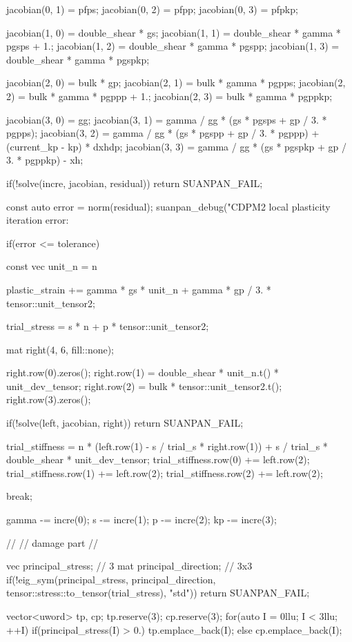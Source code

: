 \begin{cppcode}
{{		jacobian(0, 1) = pfps;
		jacobian(0, 2) = pfpp;
		jacobian(0, 3) = pfpkp;

		jacobian(1, 0) = double_shear * gs;
		jacobian(1, 1) = double_shear * gamma * pgsps + 1.;
		jacobian(1, 2) = double_shear * gamma * pgspp;
		jacobian(1, 3) = double_shear * gamma * pgspkp;

		jacobian(2, 0) = bulk * gp;
		jacobian(2, 1) = bulk * gamma * pgpps;
		jacobian(2, 2) = bulk * gamma * pgppp + 1.;
		jacobian(2, 3) = bulk * gamma * pgppkp;

		jacobian(3, 0) = gg;
		jacobian(3, 1) = gamma / gg * (gs * pgsps + gp / 3. * pgpps);
		jacobian(3, 2) = gamma / gg * (gs * pgspp + gp / 3. * pgppp) + (current_kp - kp) * dxhdp;
		jacobian(3, 3) = gamma / gg * (gs * pgspkp + gp / 3. * pgppkp) - xh;

		if(!solve(incre, jacobian, residual)) return SUANPAN_FAIL;

		const auto error = norm(residual);
		suanpan_debug("CDPM2 local plasticity iteration error: %

		if(error <= tolerance) {
			const vec unit_n = n %

			plastic_strain += gamma * gs * unit_n + gamma * gp / 3. * tensor::unit_tensor2;

			trial_stress = s * n + p * tensor::unit_tensor2;

			mat right(4, 6, fill::none);

			right.row(0).zeros();
			right.row(1) = double_shear * unit_n.t() * unit_dev_tensor;
			right.row(2) = bulk * tensor::unit_tensor2.t();
			right.row(3).zeros();

			if(!solve(left, jacobian, right)) return SUANPAN_FAIL;

			trial_stiffness = n * (left.row(1) - s / trial_s * right.row(1)) + s / trial_s * double_shear * unit_dev_tensor;
			trial_stiffness.row(0) += left.row(2);
			trial_stiffness.row(1) += left.row(2);
			trial_stiffness.row(2) += left.row(2);

			break;
		}

		gamma -= incre(0);
		s -= incre(1);
		p -= incre(2);
		kp -= incre(3);
	}

	//
	// damage part
	//

	vec principal_stress;    // 3
	mat principal_direction; // 3x3
	if(!eig_sym(principal_stress, principal_direction, tensor::stress::to_tensor(trial_stress), "std")) return SUANPAN_FAIL;

	vector<uword> tp, cp;
	tp.reserve(3);
	cp.reserve(3);
	for(auto I = 0llu; I < 3llu; ++I)
		if(principal_stress(I) > 0.) tp.emplace_back(I);
		else cp.emplace_back(I);

}
\end{cppcode}
